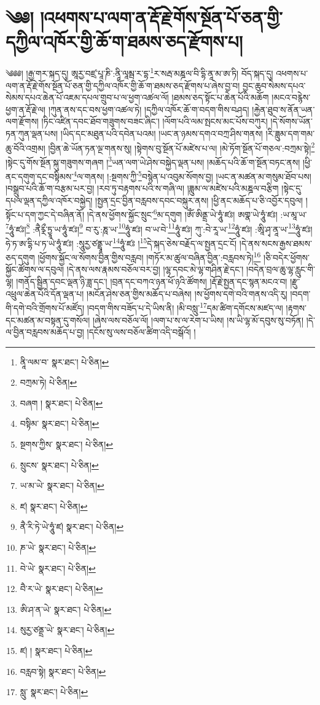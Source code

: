 \setcounter{footnote}{0} 
\chapter{༄༅། །འཕགས་པ་ལག་ན་རྡོ་རྗེ་གོས་སྔོན་པོ་ཅན་གྱི་དཀྱིལ་འཁོར་གྱི་ཆོ་ག་ཐམས་ཅད་རྫོགས་པ།}༄༅༅། །རྒྱ་གར་སྐད་དུ། ཨཱརྱ་བཛྲ་པཱ་ཎི་:ནཱི་ལཱམྦ་ར་དྷ་\footnote{ནཱི་ལམ་བ་  སྣར་ཐང་།  པེ་ཅིན། }ར་སརྦ་མཎྜལ་བི་དྷི་ནཱ་མ་ཨ་ཏི། བོད་སྐད་དུ། འཕགས་པ་ལག་ན་རྡོ་རྗེ་གོས་སྔོན་པོ་ཅན་གྱི་དཀྱིལ་འཁོར་གྱི་ཆོ་ག་ཐམས་ཅད་རྫོགས་པ་ཞེས་བྱ་བ། བྱང་ཆུབ་སེམས་དཔའ་སེམས་དཔའ་ཆེན་པོ་འཇམ་དཔལ་གྲུབ་པ་ལ་ཕྱག་འཚལ་ལོ། །ཐམས་ཅད་སྟོང་པ་ཆེན་པོའི་མཆོག །མངའ་བརྙེས་ཕྱག་ན་རྡོ་རྗེ་ལ། །ཀུན་ནས་དང་བས་ཕྱག་འཚལ་ཏེ། །དཀྱིལ་འཁོར་ཆོ་ག་བདག་གིས་བཤད། །རྐྱེན་ཐུབ་ས་ནོན་ཡན་ལག་རྫོགས། །ཏིང་འཛིན་དབང་ཐོབ་གཟུགས་བཟང་ཞིང་། །ལོག་པའི་ལམ་སྤངས་མང་པོས་བཀུར། །དེ་སོགས་ཡོན་ཏན་ཀུན་ལྡན་པས། །ཡིད་དང་མཐུན་པའི་དབེན་པའམ། །ཡང་ན་ཉམས་དགའ་བཀྲ་ཤིས་གནས། །རི་ཟླུམ་དག་གམ་ཆུ་བོའི་འགྲམ། །བྱིན་ཆེ་ཡོན་ཏན་ལྔ་གནས་སུ། །སྟེགས་བུ་སྔོན་པོ་མཛེས་པ་ལ། །མེ་ཏོག་སྔོན་པོ་གཅལ་:བཀྲམ་སྟེ།\footnote{བཀྲམ་ཏེ།  པེ་ཅིན། } །སྟེང་དུ་གོས་སྔོན་སྐུ་གཟུགས་གཞག །\footnote{བཞག །  སྣར་ཐང་།  པེ་ཅིན། }ཡན་ལག་ཡེ་ཤེས་བསྐྱེད་ལྡན་པས། །མཆོད་པའི་ཆོ་ག་སྔོན་བཏང་ནས། །ཕྱི་ནང་དགུག་དང་བསྟིམས་\footnote{བསྟིམ་  སྣར་ཐང་།  པེ་ཅིན། }ལ་གནས། །:སྔགས་ཀྱི་\footnote{སྔགས་ཀྱིས་  སྣར་ཐང་།  པེ་ཅིན། }བསྙེན་པ་འབུམ་སོགས་བྱ། །ཡང་ན་མཚན་མ་གསུམ་ཐོབ་པས། །བསྒྲུབ་པའི་ཆོ་ག་བརྩམ་པར་བྱ། །རབ་ཏུ་བརྟགས་པའི་ས་གཞི་ལ། །ཟླུམ་ལ་མཛེས་པའི་མཎྜལ་བརྩིག །སྟེང་དུ་དཔལ་ལྡན་དཀྱིལ་འཁོར་བསྐྱེད། །སྤྱན་དྲང་བྱིན་བརླབས་དབང་བསྐུར་ནས། །ཕྱི་ནང་མཆོད་པ་ཅི་འབྱོར་དབུལ། །སྟོང་པ་དག་ཀྱང་དེ་བཞིན་ནོ། །དེ་ནས་ཕྱོགས་སྐྱོང་སྲུང་\footnote{སྲུངས་  སྣར་ཐང་།  པེ་ཅིན། }མ་དགུག །ཨོཾ་ཨིནྡྲ་ཡེ་ཧཱུཾ་ཛཿ། ཨགྣ་ཡེ་ཧཱུཾ་ཛཿ། :ཡ་མཱ་ཡ་\footnote{ཡ་མ་ཡེ་  སྣར་ཐང་།  པེ་ཅིན། }ཧཱུཾ་ཛཿ།\footnote{ཛ།  སྣར་ཐང་།  པེ་ཅིན། } :ནཻཪྼྀ་ཏྱཱ་ཡ་ཧཱུཾ་ཛཿ།\footnote{ནཻ་རི་ཏེ་ཡེ་ཧཱུཾ་ཛ།  སྣར་ཐང་།  པེ་ཅིན། } བ་རུ་:ཎཱ་ཡ་\footnote{ཎ་ཡེ་  སྣར་ཐང་།  པེ་ཅིན། }ཧཱུཾ་ཛཿ། བ་ཡ་བེ་\footnote{བེ་ཡེ་  སྣར་ཐང་།  པེ་ཅིན། }ཧཱུཾ་ཛཿ། ཀུ་:བེ་རཱ་ཡ་\footnote{བཻ་ར་ཡེ་  སྣར་ཐང་།  པེ་ཅིན། }ཧཱུཾ་ཛཿ། :ཨཱི་ཤྭ་ནཱ་ཡ་\footnote{ཨི་ཤ་ན་ཡེ་  སྣར་ཐང་།  པེ་ཅིན། }ཧཱུཾ་ཛཿ། ཧེ་ཏ་ཨ་དྷི་པ་ཏ་ཡེ་ཧཱུཾ་ཛཿ། :སཱུརྱ་ཙནྡྲཱ་ཡ་\footnote{སུརྱ་ཙནྡྲ་ཡེ་  སྣར་ཐང་།  པེ་ཅིན། }ཧཱུཾ་ཛཿ །\footnote{ཛ། །  སྣར་ཐང་།  པེ་ཅིན། }དེ་སྐད་ཅེས་བརྗོད་ལ་སྤྱན་དྲང་ངོ། །དེ་ནས་སངས་རྒྱས་ཐམས་ཅད་དགུག །ཕྱོགས་སྐྱོང་ལ་སོགས་བྱིན་གྱིས་བརླབ། །གཏོར་མ་ཚུལ་བཞིན་བྱིན་:བརླབས་ཏེ།\footnote{བརླབ་སྟེ།  སྣར་ཐང་།  པེ་ཅིན། } །ཅི་བདེར་ཕྱོགས་སྐྱོང་ཚོགས་ལ་དབུལ། །དེ་ནས་ལས་རྣམས་བཅོལ་བར་བྱ། །ལྷ་དབང་མེ་ལྷ་གཤིན་རྗེ་དང་། །བདེན་བྲལ་ཆུ་ལྷ་རླུང་གི་ལྷ། །གནོད་སྦྱིན་དབང་ལྡན་ཉི་ཟླ་དང་། །བྲན་དང་བཀའ་ཉན་ཕོ་ཉའི་ཚོགས། །རྡོ་རྗེ་སྤྱན་དང་སྙན་མངའ་བ། །རྫུ་འཕྲུལ་ཆེན་པོའི་དོན་ལྡན་པ། །མངོན་ཤེས་ཅན་གྱིས་མཆོད་པ་བཞེས། །ས་ཕྱོགས་དགེ་བའི་གནས་འདི་རུ། །བདག་གི་དགེ་བའི་གྲོགས་པོ་མཛོད། །བདག་གིས་བཟོད་པ་དེ་ཡིས་ནི། །མི་བསླུ་\footnote{སླུ་  སྣར་ཐང་།  པེ་ཅིན། }དམ་ཚིག་དགོངས་མཛད་ལ། །རྟགས་དང་མཚན་མ་བསྟན་དུ་གསོལ། །ཞེས་ལས་བཅོལ་ལོ། །ལག་པ་ས་ལ་རེག་པ་ཡིས། །ས་ཡི་ལྷ་མོ་དབུས་སུ་བཏོན། །དེ་ལ་བྱིན་བརླབས་མཆོད་པ་བྱ། །དངོས་སུ་ལས་བཅོལ་ཚིག་འདི་བསྒོའོ། །
